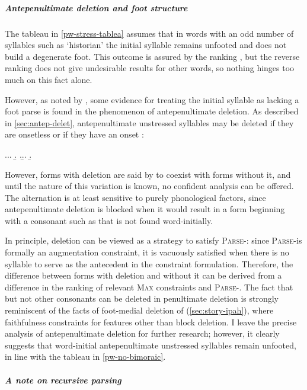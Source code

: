 \subparagraph{Antepenultimate deletion and foot structure}
\label{sec:penult-delet-foot}

The tableau in \cref{pw-stress-tablea} assumes that in words with an odd number of syllables such as \ipa{[haˈneːsið]} `historian' the initial syllable remains unfooted and does not build a degenerate foot. This outcome is assured by the ranking , but the reverse ranking does not give undesirable results for other words, so nothing hinges too much on this fact alone.

However, as noted by \citet{hannahs11:_welsh}, some evidence for treating the initial syllable as lacking a foot parse is found in the phenomenon of antepenultimate deletion. As described in \cref{sec:antep-delet}, antepenultimate unstressed syllables may be deleted if they are onsetless or if they have an onset \ipa{[h]}:

\ex.\a.\a.
\b.
\z.\b.\a.
\b.

However, forms with deletion are said by \citet{awbery86:_pembr_welsh} to coexist with forms without it, and until the nature of this variation is known, no confident analysis can be offered. The alternation is at least sensitive to purely phonological factors, since antepenultimate deletion is blocked when it would result in a form beginning with a consonant such as \ipa{[χ]} that is not found word-initially.

In principle, deletion can be viewed as a strategy to satisfy \textsc{Parse}-\sy: since \textsc{Parse}-\sy is formally an augmentation constraint, it is vacuously satisfied when there is no syllable to serve as the antecedent in the constraint formulation. Therefore, the difference between forms with deletion and without it can be derived from a difference in the ranking of relevant \textsc{Max} constraints and \textsc{Parse}-\sy. The fact that \ipa{[h]} but not other consonants can be deleted in penultimate deletion is strongly reminiscent of the facts of foot\hyp medial deletion of \ipa{[h]} (\cref{sec:story-ipah}), where faithfulness constraints for features other than  block deletion. I leave the precise analysis of antepenultimate deletion for further research; however, it clearly suggests that word\hyp initial antepenultimate unstressed syllables remain unfooted, in line with the tableau in \ref{pw-no-bimoraic}.

\subparagraph{A note on recursive parsing}
\label{sec:note-recurs-pars}

